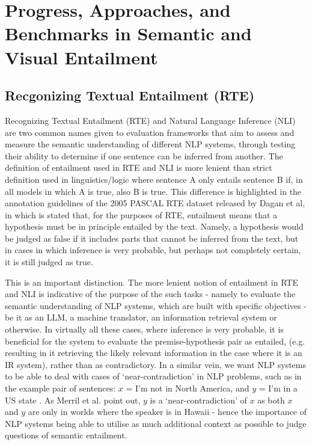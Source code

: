 \documentclass[12pt,twoside]{report}
\begin{document}
\section{Progress, Approaches, and Benchmarks in Semantic and Visual Entailment}

\subsection{Recgonizing Textual Entailment (RTE)}

Recognizing Textual Entailment (RTE) and Natural Language Inference (NLI) are two common names given to evaluation frameworks that aim to assess and measure the semantic understanding of different NLP systems, \cite{poliak-2020-survey} through testing their ability to determine if one sentence can be inferred from another. The definition of entailment used in RTE and NLI is more lenient than strict definition used in linguistics/logic where sentence A only entails sentence B if, in all models in which A is true, also B is true. \cite{sep-montague-semantics} This difference is highlighted in the annotation guidelines of the 2005 PASCAL RTE dataset released by Dagan et al, in which is stated that, for the purposes of RTE, entailment means that a hypothesis must be in principle entailed by the text. Namely, a hypothesis would be judged as false if it includes parts that cannot be inferred from the text, but in cases in which inference is very probable, but perhaps not completely certain, it is still judged as true. \cite{dagan2005} \newline \par

This is an important distinction. The more lenient notion of entailment in RTE and NLI is indicative of the purpose of the such tasks - namely to evaluate the semantic understanding of NLP systems, which are built with specific objectives - be it as an LLM, a machine translator, an information retrieval system or otherwise. In virtually all these cases, where inference is very probable, it is beneficial for the system to evaluate the premise-hypothesis pair as entailed, (e.g. resulting in it retrieving the likely relevant information in the case where it is an IR system), rather than as contradictory. In a similar vein, we want NLP systems to be able to deal with cases of `near-contradiction' in NLP problems, such as in the example pair of sentences: $x$ = I’m not in North America, and $y$ = I’m in a US state \cite{merrill-etal-2022-entailment}. As Merril et al. point out, $y$ is a `near-contradiction' of $x$ as both $x$ and $y$ are only in worlds where the speaker is in Hawaii - hence the importance of NLP systems being able to utilise as much additional context as possible to judge questions of semantic entailment. 
\end{document}
